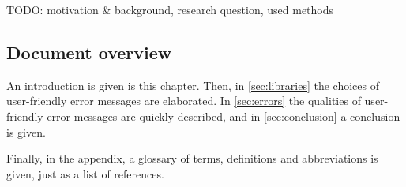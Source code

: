 TODO: motivation & background, research question, used methods\\

\subsection{Document overview}
An introduction is given is this chapter.
Then, in \autoref{sec:libraries} the choices of user-friendly error messages are elaborated.
In \autoref{sec:errors} the qualities of user-friendly error messages are quickly described, and in \autoref{sec:conclusion} a conclusion is given.

Finally, in the appendix, a glossary of terms, definitions and abbreviations is given, just as a list of references.
